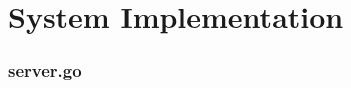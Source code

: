 \documentclass[12pt]{article}
\begin{document}

\fi  %


\iftrue  %


\section{System Implementation}

\lstset{language=Go}
\lstset{basicstyle=\ttffamily}

\subsubsection{server.go}
%
\end{document}
